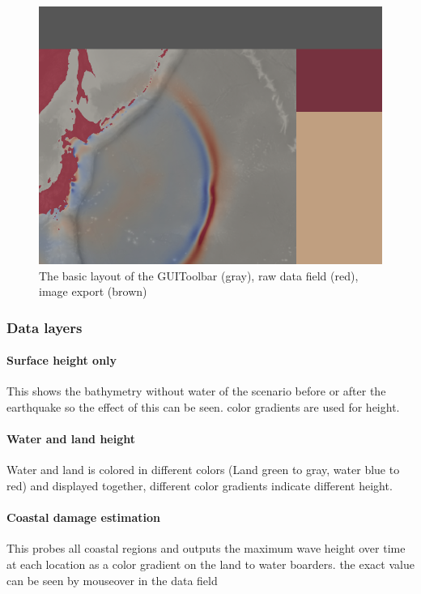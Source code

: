\documentclass[paper=a4]{proc}
\begin{document}
			\begin{figure}
				\includegraphics[clip, width=\linewidth]{../../presentation4/img/GUI.png}
				\caption*{\centering The basic layout of the GUI\newline Toolbar (gray), raw data field (red), image export (brown)}
			\end{figure}
			
			\subsubsection{Data layers}
			\paragraph{Surface height only}\hspace{0pt}\newline
			This shows the bathymetry without water of the scenario before or after the earthquake so the effect of this can be seen. color gradients are used for height.
			
			\paragraph{Water and land height}\hspace{0pt}\newline
			Water and land is colored in different colors (Land green to gray, water blue to red) and displayed together, different color gradients indicate different height.
			
			\paragraph{Coastal damage estimation}\hspace{0pt}\newline
		 This probes all coastal regions and outputs the maximum wave height over time at each location as a color gradient on the land to water boarders. the exact value can be seen by mouseover in the data field 
\end{document}
